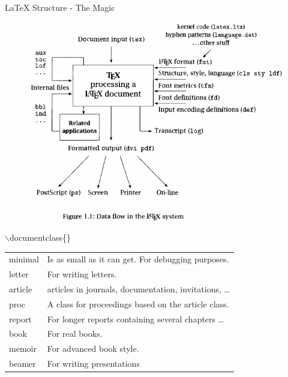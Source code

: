 \documentclass[10pt,times]{beamer}
\begin{document}
\begin{frame}{LaTeX Structure - The Magic}
\begin{figure}
\centering
\includegraphics[height=0.95\textheight]{figs/LaTeX.png}
\end{figure}
\end{frame}


\begin{frame}{$\backslash$documentclass\{\}}

\begin{table}
\renewcommand{\arraystretch}{1.5}
\begin{tabularx}{0.9\textwidth}{l X}
\toprule
minimal & Is as small as it can get. For debugging purposes.\\ 
letter & For writing letters. \\ 
article & articles in journals, documentation, invitations, \dots \\ 
proc & A class for proceedings based on the article class.\\ 
report & For longer reports containing several chapters \dots \\
book & For real books.\\
memoir & For advanced book style. \\
beamer& For writing presentations \\ \bottomrule
\end{tabularx}
\end{table}
\end{frame}
\end{document}
